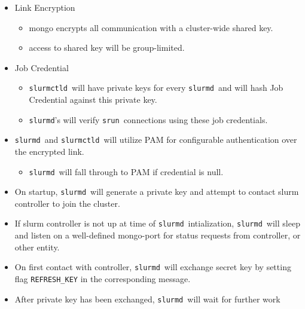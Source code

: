 \documentclass[article,letter,landscape]{seminar}
\newcommand{\slurmd}{{\tt slurmd}}
\newcommand{\slurmctld}{{\tt slurmctld}}
\newcommand{\srun}{{\tt srun}}
\begin{document}
\begin{slide}
  \begin{center}
  \begin{itemize}
  \item Link Encryption
  \begin{itemize}
    \item mongo encrypts all communication with a cluster-wide
          shared key.
    \item access to shared key will be group-limited.
  \end{itemize}
  \item Job Credential
  \begin{itemize}
    \item \slurmctld\ will have private keys for every \slurmd\
          and will hash Job Credential against this private key.
    \item \slurmd 's will verify \srun\ connections using these
          job credentials.
  \end{itemize}
  \item \slurmd\ and \slurmctld\ will utilize PAM for configurable authentication
        over the encrypted link.
  \begin{itemize}
    \item \slurmd\ will fall through to PAM if credential is null.
  \end{itemize}
  \end{itemize}
  \end{center}
\end{slide}


\begin{slide}
  \slideheading{\slurmd\ Initialization}
  \begin{center}
  \begin{itemize}
  \item On startup, \slurmd\ will generate a private key  and 
        attempt to contact slurm controller to join the cluster.
  \item If slurm controller is not up at time of \slurmd\ intialization, 
        \slurmd\ will sleep and listen on a well-defined mongo-port for status 
	requests from controller, or other entity. 
  \item On first contact with controller, \slurmd\ will exchange secret key
        by setting flag {\tt REFRESH\_KEY} in the corresponding message.
  \item After private key has been exchanged, \slurmd\ will wait for
        further work 
  \end{itemize}
  \end{center}
\end{slide}
\end{document}
